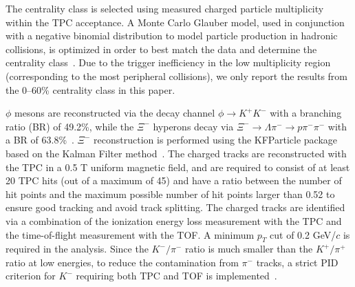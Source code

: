 \documentclass[aps,tightenlines,superscriptaddress,twocolumn]{revtex4-1}
\begin{document}
The centrality class is selected using measured charged particle multiplicity within the TPC acceptance. 
A Monte Carlo Glauber model, used in conjunction with a negative binomial distribution to model particle production in hadronic collisions, is optimized in order to best match the data and determine the centrality class~\cite{MC_Ray_2008,STAR_3Gev_Cumulants:2021}. Due to the trigger inefficiency in the low multiplicity region (corresponding to the most peripheral collisions), we only report the results from the 0--60\% %
centrality class in this paper.

$\phi$ mesons are reconstructed via the decay channel $\phi\rightarrow K^+K^-$ with a branching ratio (BR) of 49.2\%, while the $\Xi^{-}$ hyperons decay via $\Xi^-\rightarrow \Lambda\pi^-\rightarrow p\pi^-\pi^-$ with a BR of 63.8\%~\cite{pdg:2020}. $\Xi^-$ reconstruction is performed using the KFParticle package based on the Kalman Filter method~\cite{Kisel:2018nvd,STAR_PRL_Xi_Oemga_polarization:2021}. The charged tracks are reconstructed with the TPC in a 0.5 T uniform magnetic field, and are required to consist of at least 20 TPC hits (out of a maximum of 45) and have a ratio between the number of hit points and the maximum possible number of hit points larger than 0.52 to ensure good tracking and avoid track splitting. %
The charged tracks are identified via a combination of the ionization energy loss %
measurement with the TPC and the time-of-flight %
measurement with the TOF. A minimum $p_T$ cut of 0.2 GeV/$c$ is required in the analysis.
Since the $K^{-}/\pi^{-}$ ratio is much smaller than the $K^{+}/\pi^{+}$ ratio at low energies, to reduce the contamination from $\pi^{-}$ tracks, a strict PID criterion for $K^{-}$ requiring both TPC and TOF is implemented~\cite{Shao:2005iu,Xu:2008th}.
\end{document}
